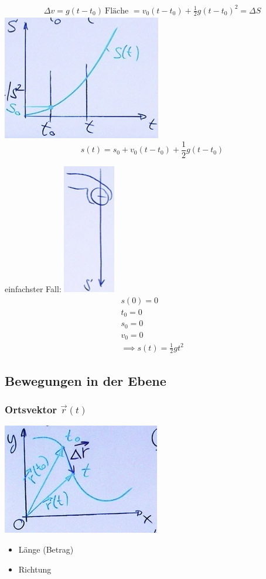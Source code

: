 \begin{bsp*}[note = Der freie Fall]
\begin{gather*}
		\Delta v = g( t - t_0 ) \
		\text{Fläche } = v_0 ( t - t_0 ) + \frac{1}{2} g( t - t_0 )^2 = \Delta S
	\end{gather*}
	\includegraphics{Bild11}
	\[ s(t) = s_0 + v_0 ( t - t_0 ) + \frac{1}{2} g( t - t_0 ) \]
	
	einfachster Fall:
	\includegraphics{Bild12}
	\begin{gather*}
		s(0) = 0 \\
		t_0 = 0 \\
		s_0 = 0 \\
		v_0 = 0 \\
		\implies s(t) = \frac{1}{2} gt^2
	\end{gather*}
\end{bsp*}

\subsection{Bewegungen in der Ebene}
\subsubsection{Ortsvektor \texorpdfstring{$\vec{r}(t)$}{r(t)}}
\includegraphics{Bild13}
\begin{itemize}[label = $\rightarrow$]
	\item Länge (Betrag)
	\item Richtung
\end{itemize}

